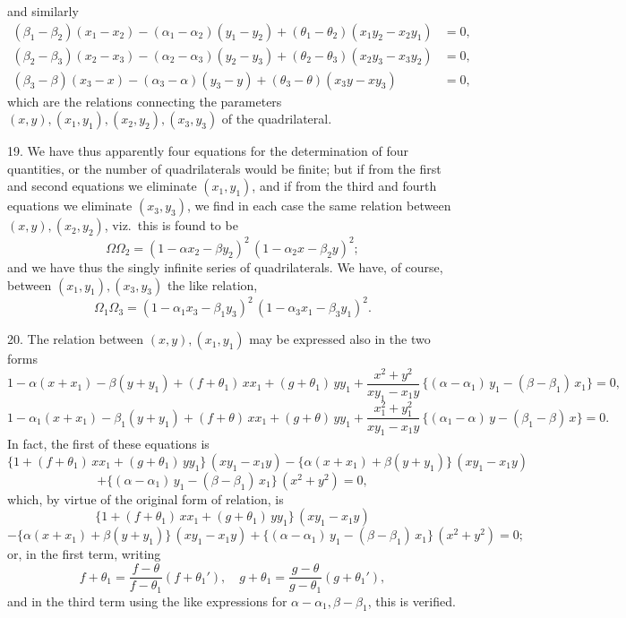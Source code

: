 \documentclass[11pt,a4paper]{article}
\begin{document}
and similarly
\begin{align*}
(\beta_{1} - \beta_{2})(x_{1} - x_{2}) - (\alpha_{1} - \alpha_{2})(y_{1} - y_{2}) + (\theta_{1} - \theta_{2})(x_{1}y_{2} - x_{2}y_{1}) &= 0,\\
(\beta_{2} - \beta_{3})(x_{2} - x_{3}) - (\alpha_{2} - \alpha_{3})(y_{2} - y_{3}) + (\theta_{2} - \theta_{3})(x_{2}y_{3} - x_{3}y_{2}) &= 0,\\
(\beta_{3} - \beta)(x_{3} - x) - (\alpha_{3} - \alpha)(y_{3} - y) + (\theta_{3} - \theta)(x_{3}y - xy_{3}) &= 0,
\end{align*}
which are the relations connecting the parameters $(x, y), (x_{1}, y_{1}), (x_{2}, y_{2}), (x_{3}, y_{3})$ of the quadrilateral.

\medskip

19. We have thus apparently four equations for the determination of four quantities, or the number of quadrilaterals would be finite; but if from the first and second equations we eliminate $(x_{1}, y_{1})$, and if from the third and fourth equations we eliminate $(x_{3}, y_{3})$, we find in each case the same relation between $(x, y), (x_{2}, y_{2})$, viz.\ this is found to be
\[
\Omega\Omega_{2} = (1 - \alpha x_{2} - \beta y_{2})^{2}\,(1 - \alpha_{2}x - \beta_{2}y)^{2};
\]
and we have thus the singly infinite series of quadrilaterals. We have, of course, between $(x_{1}, y_{1}), (x_{3}, y_{3})$ the like relation,
\[
\Omega_{1}\Omega_{3} = (1 - \alpha_{1}x_{3} - \beta_{1}y_{3})^{2}\,(1 - \alpha_{3}x_{1} - \beta_{3}y_{1})^{2}.
\]

\newpage


20. The relation between $(x, y), (x_{1}, y_{1})$ may be expressed also in the two forms
\[
1 - \alpha(x + x_{1}) - \beta(y + y_{1}) + (f + \theta_{1})\,xx_{1} + (g + \theta_{1})\,yy_{1} + \frac{x^{2} + y^{2}}{xy_{1} - x_{1}y}\,\{(\alpha - \alpha_{1})\,y_{1} - (\beta - \beta_{1})\,x_{1}\} = 0,
\]
\[
1 - \alpha_{1}(x + x_{1}) - \beta_{1}(y + y_{1}) + (f + \theta)\,xx_{1} + (g + \theta)\,yy_{1} + \frac{x_{1}^{2} + y_{1}^{2}}{xy_{1} - x_{1}y}\,\{(\alpha_{1} - \alpha)\,y - (\beta_{1} - \beta)\,x\} = 0.
\]
In fact, the first of these equations is
\[
\{1 + (f + \theta_{1})\,xx_{1} + (g + \theta_{1})\,yy_{1}\}\,(xy_{1} - x_{1}y) - \{\alpha(x + x_{1}) + \beta(y + y_{1})\}\,(xy_{1} - x_{1}y)
\]
\[
+ \{(\alpha - \alpha_{1})\,y_{1} - (\beta - \beta_{1})\,x_{1}\}\,(x^{2} + y^{2}) = 0,
\]
which, by virtue of the original form of relation, is
\[
\{1 + (f + \theta_{1})\,xx_{1} + (g + \theta_{1})\,yy_{1}\}\,(xy_{1} - x_{1}y)
\]
\[
- \{\alpha(x + x_{1}) + \beta(y + y_{1})\}\,(xy_{1} - x_{1}y) + \{(\alpha - \alpha_{1})\,y_{1} - (\beta - \beta_{1})\,x_{1}\}\,(x^{2} + y^{2}) = 0;
\]
or, in the first term, writing
\[
f + \theta_{1} = \frac{f - \theta}{f - \theta_{1}}(f + \theta_{1}'), \quad g + \theta_{1} = \frac{g - \theta}{g - \theta_{1}}(g + \theta_{1}'),
\]
and in the third term using the like expressions for $\alpha - \alpha_{1}, \beta - \beta_{1}$, this is verified.
\end{document}
